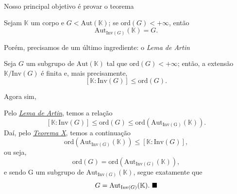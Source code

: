 \documentclass[../algebraIII_notes.tex]{subfiles}
\begin{document}
Nosso principal objetivo é provar o teorema
\begin{theorem*}
	Sejam \(\mathbb{K}\) um corpo e \(G<\mathrm{Aut}(\mathbb{K})\); se \(\mathrm{ord}(G)<+\infty\), então
	\[
		\mathrm{Aut}_{\mathrm{Inv}(G)}(\mathbb{K})=G.
	\]
\end{theorem*}
Porém, precisamos de um último ingrediente: o \textit{Lema de Artin}
\hypertarget{artin_lemma}{
	\begin{lemma*}
		Seja \(G\) um subgrupo de \(\mathrm{Aut}(\mathbb{K})\) tal que \(\mathrm{ord}(G) < +\infty\); então, a extensão \(\mathbb{K}/\mathrm{Inv}(G)\) é finita e, mais precisamente,
		\[
			[\mathbb{K}:\mathrm{Inv}(G)]\leq \mathrm{ord}(G).
		\]
	\end{lemma*}
}
Agora sim,
\begin{proof*}[Teorema]
	Pelo \hyperlink{artin_lemma}{\textit{Lema de Artin}}, temos a relação
	\[
		[\mathbb{K}:\mathrm{Inv}(G)] \leq \mathrm{ord}(G) \leq \mathrm{ord}(\mathrm{Aut}_{\mathrm{Inv(G)}}(\mathbb{K})).
	\]
	Daí, pelo \hyperlink{x_theorem}{\textit{Teorema X}}, temos a continuação
	\[
		\mathrm{ord}(\mathrm{Aut}_{\mathrm{Inv}(G)}(\mathbb{K}))\leq [\mathbb{K}:\mathrm{Inv}(G)],
	\]
	ou seja,
	\[
		\mathrm{ord}(G) = \mathrm{ord}(\mathrm{Aut}_{\mathrm{Inv}(G)}(\mathbb{K})),
	\]
	e sendo G um subgrupo de \(\mathrm{Aut}_{\mathrm{Inv}(G)}(\mathbb{K})\), segue exatamente que
	\[
		G= \mathrm{Aut}_{\mathrm{Inv}(G)}(\mathbb{K}). \text{ $\blacksquare$}
	\]
\end{proof*}
\end{document}
